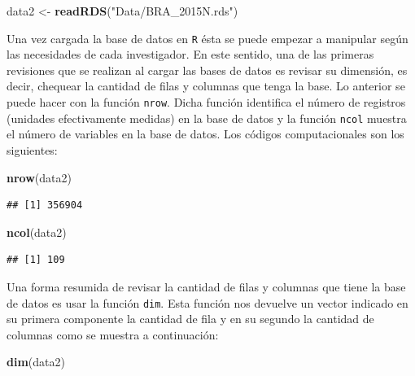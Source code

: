 \documentclass[
  12pt,
]{book}
\newenvironment{Shaded}{\begin{snugshade}}{\end{snugshade}}
\newcommand{\FunctionTok}[1]{\textcolor[rgb]{0.13,0.29,0.53}{\textbf{#1}}}
\newcommand{\NormalTok}[1]{#1}
\newcommand{\OtherTok}[1]{\textcolor[rgb]{0.56,0.35,0.01}{#1}}
\newcommand{\StringTok}[1]{\textcolor[rgb]{0.31,0.60,0.02}{#1}}
\begin{document}
\begin{Shaded}
\begin{Highlighting}[]
\NormalTok{data2 }\OtherTok{\textless{}{-}} \FunctionTok{readRDS}\NormalTok{(}\StringTok{"Data/BRA\_2015N.rds"}\NormalTok{)}
\end{Highlighting}
\end{Shaded}

Una vez cargada la base de datos en \texttt{R} ésta se puede empezar a manipular según las necesidades de cada investigador. En este sentido, una de las primeras revisiones que se realizan al cargar las bases de datos es revisar su dimensión, es decir, chequear la cantidad de filas y columnas que tenga la base. Lo anterior se puede hacer con la función \texttt{nrow}. Dicha función identifica el número de registros (unidades efectivamente medidas) en la base de datos y la función \texttt{ncol} muestra el número de variables en la base de datos. Los códigos computacionales son los siguientes:

\begin{Shaded}
\begin{Highlighting}[]
\FunctionTok{nrow}\NormalTok{(data2)}
\end{Highlighting}
\end{Shaded}

\begin{verbatim}
## [1] 356904
\end{verbatim}

\begin{Shaded}
\begin{Highlighting}[]
\FunctionTok{ncol}\NormalTok{(data2)}
\end{Highlighting}
\end{Shaded}

\begin{verbatim}
## [1] 109
\end{verbatim}

Una forma resumida de revisar la cantidad de filas y columnas que tiene la base de datos es usar la función \texttt{dim}. Esta función nos devuelve un vector indicado en su primera componente la cantidad de fila y en su segundo la cantidad de columnas como se muestra a continuación:

\begin{Shaded}
\begin{Highlighting}[]
\FunctionTok{dim}\NormalTok{(data2)}
\end{Highlighting}
\end{Shaded}
\end{document}
